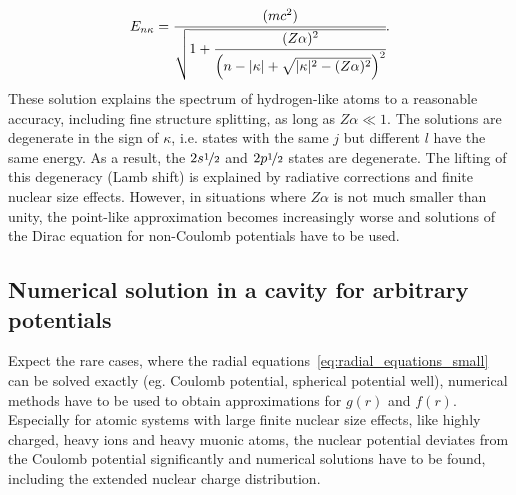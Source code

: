 \begin{equation}
\label{eq:finestructure_formula}
E_{n\kappa}=\cfrac{(mc^2)}{\sqrt{1+\cfrac{(Z\alpha)^2}{\left( n-|\kappa|+\sqrt{|\kappa|^2-(Z\alpha)^2} \right)^2}}}.
\end{equation}
These solution explains the spectrum of hydrogen-like atoms to a reasonable accuracy, including fine structure splitting, as long as $Z\alpha\ll 1$. The solutions are degenerate in the sign of $\kappa$, i.e. states with the same $j$ but different $l$ have the same energy. As a result, the $2s\nicefrac{1}{2}$ and $2p\nicefrac{1}{2}$ states are degenerate. The lifting of this degeneracy (Lamb shift) is explained by radiative corrections and finite nuclear size effects. However, in situations where $Z\alpha$ is not much smaller than unity, the point-like approximation becomes increasingly worse and solutions of the Dirac equation for non-Coulomb potentials have to be used.



\subsection{Numerical solution in a cavity for arbitrary potentials}
Expect the rare cases, where the radial equations~\eqref{eq:radial_equations_small} can be solved exactly (eg. Coulomb potential, spherical potential well), numerical methods have to be used to obtain approximations for $g(r)$ and $f(r)$. Especially for atomic systems with large finite nuclear size effects, like highly charged, heavy ions and heavy muonic atoms, the nuclear potential deviates from the Coulomb potential significantly and numerical solutions have to be found, including the extended nuclear charge distribution. 





